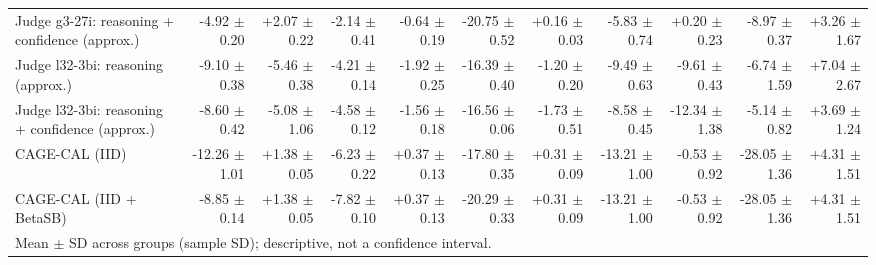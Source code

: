 \begin{tabular}{lrrrrrrrrrr}
Judge g3-27i: reasoning + confidence (approx.) & -4.92 {\scriptsize $\pm$ 0.20} & +2.07 {\scriptsize $\pm$ 0.22} & -2.14 {\scriptsize $\pm$ 0.41} & -0.64 {\scriptsize $\pm$ 0.19} & -20.75 {\scriptsize $\pm$ 0.52} & +0.16 {\scriptsize $\pm$ 0.03} & -5.83 {\scriptsize $\pm$ 0.74} & +0.20 {\scriptsize $\pm$ 0.23} & -8.97 {\scriptsize $\pm$ 0.37} & +3.26 {\scriptsize $\pm$ 1.67} \\
Judge l32-3bi: reasoning (approx.) & -9.10 {\scriptsize $\pm$ 0.38} & -5.46 {\scriptsize $\pm$ 0.38} & -4.21 {\scriptsize $\pm$ 0.14} & -1.92 {\scriptsize $\pm$ 0.25} & -16.39 {\scriptsize $\pm$ 0.40} & -1.20 {\scriptsize $\pm$ 0.20} & -9.49 {\scriptsize $\pm$ 0.63} & -9.61 {\scriptsize $\pm$ 0.43} & -6.74 {\scriptsize $\pm$ 1.59} & +7.04 {\scriptsize $\pm$ 2.67} \\
Judge l32-3bi: reasoning + confidence (approx.) & -8.60 {\scriptsize $\pm$ 0.42} & -5.08 {\scriptsize $\pm$ 1.06} & -4.58 {\scriptsize $\pm$ 0.12} & -1.56 {\scriptsize $\pm$ 0.18} & -16.56 {\scriptsize $\pm$ 0.06} & -1.73 {\scriptsize $\pm$ 0.51} & -8.58 {\scriptsize $\pm$ 0.45} & -12.34 {\scriptsize $\pm$ 1.38} & -5.14 {\scriptsize $\pm$ 0.82} & +3.69 {\scriptsize $\pm$ 1.24} \\
CAGE-CAL (IID) & -12.26 {\scriptsize $\pm$ 1.01} & +1.38 {\scriptsize $\pm$ 0.05} & -6.23 {\scriptsize $\pm$ 0.22} & +0.37 {\scriptsize $\pm$ 0.13} & -17.80 {\scriptsize $\pm$ 0.35} & +0.31 {\scriptsize $\pm$ 0.09} & -13.21 {\scriptsize $\pm$ 1.00} & -0.53 {\scriptsize $\pm$ 0.92} & -28.05 {\scriptsize $\pm$ 1.36} & +4.31 {\scriptsize $\pm$ 1.51} \\
CAGE-CAL (IID + BetaSB) & -8.85 {\scriptsize $\pm$ 0.14} & +1.38 {\scriptsize $\pm$ 0.05} & -7.82 {\scriptsize $\pm$ 0.10} & +0.37 {\scriptsize $\pm$ 0.13} & -20.29 {\scriptsize $\pm$ 0.33} & +0.31 {\scriptsize $\pm$ 0.09} & -13.21 {\scriptsize $\pm$ 1.00} & -0.53 {\scriptsize $\pm$ 0.92} & -28.05 {\scriptsize $\pm$ 1.36} & +4.31 {\scriptsize $\pm$ 1.51} \\
\bottomrule
\multicolumn{11}{l}{\scriptsize Mean $\pm$ SD across groups (sample SD); descriptive, not a confidence interval.} \\
\end{tabular}
